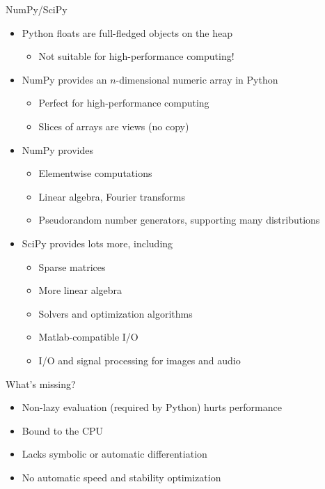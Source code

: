 \documentclass[utf8x,xcolor=pdftex,dvipsnames,table]{beamer}
\begin{document}
\begin{frame}{NumPy/SciPy}
  \begin{itemize}
  \item Python floats are full-fledged objects on the heap
      \begin{itemize}
      \item Not suitable for high-performance computing!
      \end{itemize}

  \item NumPy provides an $n$-dimensional numeric array in Python
      \begin{itemize}
      \item Perfect for high-performance computing
      \item Slices of arrays are views (no copy)
      \end{itemize}

  \item NumPy provides
      \begin{itemize}
      \item Elementwise computations
      \item Linear algebra, Fourier transforms
      \item Pseudorandom number generators, supporting many distributions
      \end{itemize}

  \item SciPy provides lots more, including
      \begin{itemize}
      \item Sparse matrices
      \item More linear algebra
      \item Solvers and optimization algorithms
      \item Matlab-compatible I/O
      \item I/O and signal processing for images and audio
      \end{itemize}
  \end{itemize}
\end{frame}

\begin{frame}{What's missing?}
  \begin{itemize}
    \item Non-lazy evaluation (required by Python) hurts performance
    \item Bound to the CPU
    \item Lacks symbolic or automatic differentiation
    \item No automatic speed and stability optimization
  \end{itemize}

\end{frame}
\end{document}
